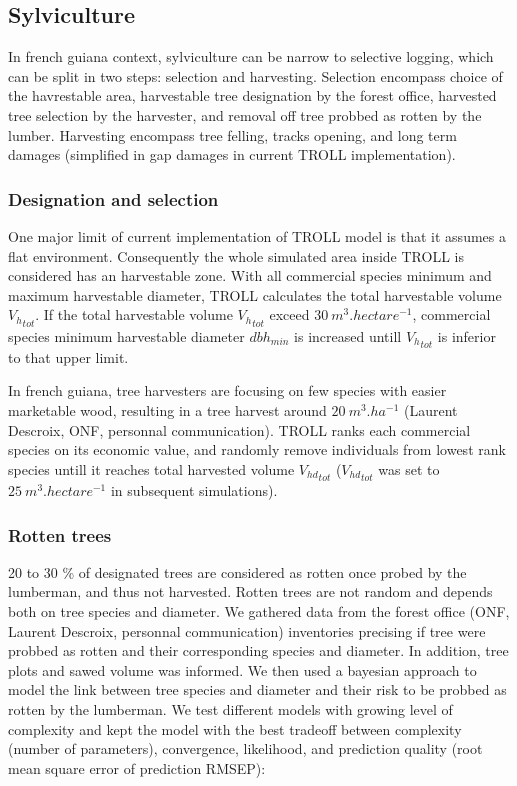 \documentclass[12pt,]{article}
\theoremstyle{definition}
\theoremstyle{definition}
\theoremstyle{remark}
\begin{document}
\subsection{Sylviculture}\label{sylviculture}

In french guiana context, sylviculture can be narrow to selective
logging, which can be split in two steps: selection and harvesting.
Selection encompass choice of the havrestable area, harvestable tree
designation by the forest office, harvested tree selection by the
harvester, and removal off tree probbed as rotten by the lumber.
Harvesting encompass tree felling, tracks opening, and long term damages
(simplified in gap damages in current TROLL implementation).

\subsubsection{Designation and
selection}\label{designation-and-selection}

One major limit of current implementation of TROLL model is that it
assumes a flat environment. Consequently the whole simulated area inside
TROLL is considered has an harvestable zone. With all commercial species
minimum and maximum harvestable diameter, TROLL calculates the total
harvestable volume \({V_h}_{tot}\). If the total harvestable volume
\({V_h}_{tot}\) exceed \(30~m^3.hectare^{-1}\), commercial species
minimum harvestable diameter \(dbh_{min}\) is increased untill
\({V_h}_{tot}\) is inferior to that upper limit.

In french guiana, tree harvesters are focusing on few species with
easier marketable wood, resulting in a tree harvest around
\(20~m^3.ha^{-1}\) (Laurent Descroix, ONF, personnal communication).
TROLL ranks each commercial species on its economic value, and randomly
remove individuals from lowest rank species untill it reaches total
harvested volume \({V_{hd}}_{tot}\) (\({V_{hd}}_{tot}\) was set to
\(25~m^3.hectare^{-1}\) in subsequent simulations).

\subsubsection{Rotten trees}\label{rotten-trees}

20 to 30 \% of designated trees are considered as rotten once probed by
the lumberman, and thus not harvested. Rotten trees are not random and
depends both on tree species and diameter. We gathered data from the
forest office (ONF, Laurent Descroix, personnal communication)
inventories precising if tree were probbed as rotten and their
corresponding species and diameter. In addition, tree plots and sawed
volume was informed. We then used a bayesian approach to model the link
between tree species and diameter and their risk to be probbed as rotten
by the lumberman. We test different models with growing level of
complexity and kept the model with the best tradeoff between complexity
(number of parameters), convergence, likelihood, and prediction quality
(root mean square error of prediction RMSEP):
\end{document}
